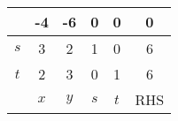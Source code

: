 \begin{tabular}[12pt]{ |c|c|c|c|c|c|}
    \hline
     & -4 & -6 & 0 & 0 & 0 \\
    \hline
    $s$ & 3 & 2 & 1 & 0 & 6\\
    \hline 
    $t$ & 2 & 3 & 0 & 1 & 6\\
    \hline
     & $x$ & $y$ & $s$ & $t$ &RHS\\
    \hline
    \end{tabular}
